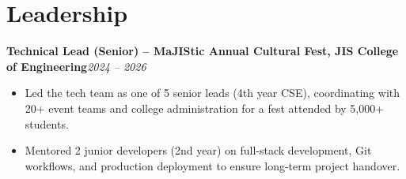 \documentclass[a4paper,10pt]{article}
\newcommand{\role}[2]{%
  \noindent\textbf{#1}\hfill\textit{\small #2}\par\vspace{1pt}
}
\begin{document}
\section*{Leadership}
\role{Technical Lead (Senior) -- MaJIStic Annual Cultural Fest, JIS College of Engineering}{2024 -- 2026}
\begin{itemize}
    \item Led the tech team as one of 5 senior leads (4th year CSE), coordinating with 20+ event teams and college administration for a fest attended by 5,000+ students.
    \item Mentored 2 junior developers (2nd year) on full-stack development, Git workflows, and production deployment to ensure long-term project handover.
\end{itemize}
\end{document}
